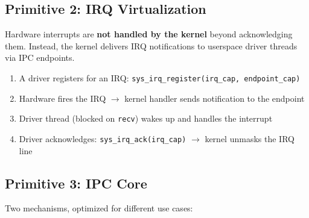 \documentclass[11pt,a4paper]{article}
\begin{document}
\subsection{Primitive 2: IRQ Virtualization}

Hardware interrupts are \textbf{not handled by the kernel} beyond acknowledging them.
Instead, the kernel delivers IRQ notifications to userspace driver threads via IPC endpoints.

\begin{enumerate}[leftmargin=2em]
  \item A driver registers for an IRQ: \texttt{sys\_irq\_register(irq\_cap, endpoint\_cap)}
  \item Hardware fires the IRQ $\rightarrow$ kernel handler sends notification to the endpoint
  \item Driver thread (blocked on \texttt{recv}) wakes up and handles the interrupt
  \item Driver acknowledges: \texttt{sys\_irq\_ack(irq\_cap)} $\rightarrow$ kernel unmasks the IRQ line
\end{enumerate}

\subsection{Primitive 3: IPC Core}

Two mechanisms, optimized for different use cases:
\end{document}
